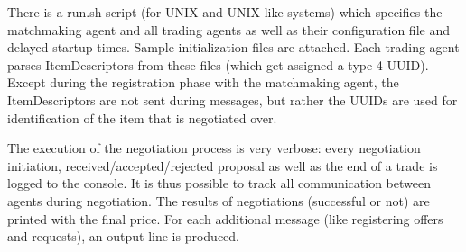 \documentclass[a4paper,11pt]{article}
\begin{document}
There is a run.sh script (for UNIX and UNIX-like systems) which specifies the matchmaking agent and all trading agents as well as their configuration file and delayed startup times. Sample initialization files are attached. Each trading agent parses ItemDescriptors from these files (which get assigned a type 4 UUID). Except during the registration phase with the matchmaking agent, the ItemDescriptors are not sent during messages, but rather the UUIDs are used for identification of the item that is negotiated over.

The execution of the negotiation process is very verbose: every negotiation initiation, received/accepted/rejected proposal as well as the end of a trade is logged to the console. It is thus possible to track all communication between agents during negotiation. The results of negotiations (successful or not) are printed with the final price. For each additional message (like registering offers and requests), an output line is produced.
\end{document}
